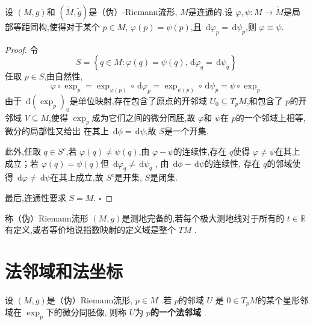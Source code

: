 \documentclass[../../几何与拓扑.tex]{subfiles}
\begin{document}
\begin{proposition}
    设 \(  \left( M,g \right)   \)和 \(  \left( \tilde{M},\tilde{g}  \right)   \)是（伪）-Riemann流形, \(  M  \)是连通的.设 \(   \varphi ,\psi :M\to  \tilde{M}  \)是局部等距同构,使得对于某个 \(  p \in M  \), \(   \varphi \left( p \right)= \psi \left( p \right)    \),且 \(  \,\mathrm{d}  \varphi _{p}= \,\mathrm{d} \psi _{p}  \),则 \(   \varphi \equiv \psi   \).        
\end{proposition}
\begin{proof}
    令\[
    S =  \left\{ q \in M:  \varphi \left( q \right)= \psi \left( q \right),\,\mathrm{d}  \varphi _{q}= \,\mathrm{d} \psi _{q}   \right\}
    \]任取 \(  p \in S  \),由自然性, \[
     \varphi \circ \exp _{p}= \exp _{ \varphi \left( p \right) }\circ \,\mathrm{d}  \varphi _{p}=  \exp _{\psi \left( p \right) }\circ \,\mathrm{d} \psi _{p}= \psi \circ \exp _{p}
    \] 由于 \(  \,\mathrm{d} \left( \exp _{p} \right)_{0}   \)是单位映射,存在包含了原点的开邻域 \(  U_0\subseteq T_{p}M  \),和包含了 \(  p  \)的开邻域 \(  V\subseteq M  \),使得 \(  \exp _{p}  \)成为它们之间的微分同胚,故 \(   \varphi   \)和 \(  \psi   \)在 \(  p  \)的一个邻域上相等,    微分的局部性又给出 在其上 \(  \,\mathrm{d} \phi = \,\mathrm{d} \psi   \),故 \(  S  \)是一个开集.  

    此外,任取 \(  q \in S^{c}  \),若 \(   \varphi \left( q \right)\neq \psi \left( q \right)    \),由 \(   \varphi -\psi   \)的连续性,存在 \(  q  \)使得 \(   \varphi \neq \psi   \)在其上成立；若 \(   \varphi \left( q \right)= \psi \left( q \right)    \)但 \(  \,\mathrm{d}  \varphi  _{q}\neq \,\mathrm{d} \psi _{q}  \) ,     由 \(  \,\mathrm{d} \phi -\,\mathrm{d} \psi   \)的连续性,  存在 \(  q  \)的邻域使得 \(  \,\mathrm{d}  \varphi \neq \,\mathrm{d} \psi   \)在其上成立,故 \(  S^{c}  \)是开集, \(  S  \)是闭集.
    
    最后,连通性要求 \(  S= M  \). 
    \hfill $\square$
\end{proof}

\begin{definition}
    称（伪）Riemann流形 \(  \left( M,g \right)   \)是测地完备的,若每个极大测地线对于所有的 \(  t \in \mathbb{R}   \)有定义,或者等价地说指数映射的定义域是整个 \(  TM  \) .  
\end{definition}

\section{法邻域和法坐标}

\begin{definition}
    设 \(  \left( M,g \right)   \)是（伪）Riemann流形, \(  p \in M  \) .若 \(  p  \)的邻域 \(  U  \)  是 \(  0 \in T_{p}M  \)的某个星形邻域在 \(  \exp _{p}  \)下的微分同胚像,   则称 \(  U  \)为 \textbf{ \(  p  \)的一个法邻域 }.
\end{definition}
\end{document}

